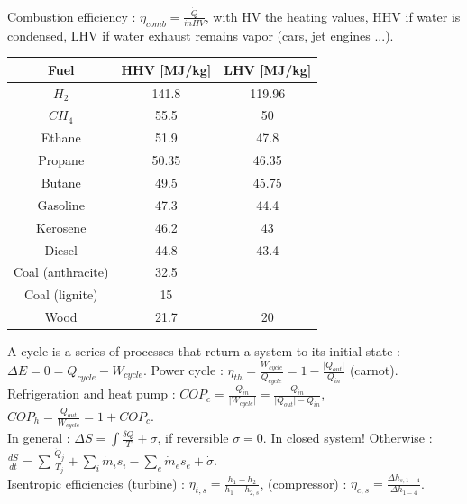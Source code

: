 \documentclass[../main.tex]{subfiles}
\begin{document}
Combustion efficiency : $\eta_{comb} = \frac{\dot{Q}}{\dot{m}HV}$, with HV the heating values, HHV if water is condensed, LHV if water exhaust remains vapor (cars, jet engines ...).\\
\begin{table}[hbt!]
    \centering
    \begin{tabular}{c|c|c}
    Fuel & HHV [MJ/kg] & LHV [MJ/kg] \\ \hline
    $H_2$ & 141.8 & 119.96\\
    $CH_4$ & 55.5 & 50\\
    Ethane & 51.9 & 47.8\\
    Propane & 50.35 & 46.35\\
    Butane & 49.5 & 45.75\\
    Gasoline & 47.3 & 44.4\\
    Kerosene & 46.2 & 43\\
    Diesel & 44.8 & 43.4\\
    Coal (anthracite) & 32.5 & \\
    Coal (lignite) & 15 & \\
    Wood & 21.7 & 20\\
    \end{tabular}
\end{table}

A cycle is a series of processes that return a system to its initial state : $\Delta E = 0 = Q_{cycle} - W_{cycle}$. Power cycle : $\eta_{th} = \frac{W_{cycle}}{Q_{cycle}} = 1-\frac{\lvert Q_{out}\rvert}{Q_{in}}$ (carnot). Refrigeration and heat pump : $COP_{c} = \frac{Q_{in}}{\lvert W_{cycle} \rvert} = \frac{Q_{in}}{\lvert Q_{out} \rvert - Q_{in}}$, $COP_h = \frac{Q_{out}}{W_{cycle}} = 1+COP_c$.\\

In general : $\Delta S = \int \frac{\delta Q}{T}+\sigma$, if reversible $\sigma = 0$. \warning In closed system! Otherwise : $\frac{dS}{dt} = \sum \frac{\dot{Q}_j}{T_j} + \sum_i \dot{m}_i s_i - \sum_e \dot{m}_e s_e + \dot{\sigma}$.\\

Isentropic efficiencies (turbine) : $\eta_{t,s} = \frac{h_1-h_2}{h_1-h_{2,s}}$, (compressor) : $\eta_{c,s} = \frac{\Delta h_{s,1-4}}{\Delta h_{1-4}}$.\\
\end{document}
